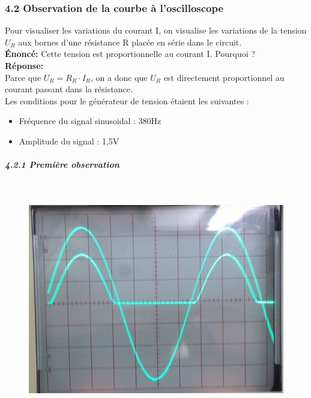 \documentclass{report}
\begin{document}
\newpage
\subsubsection*{4.2 Observation de la courbe \`a l'oscilloscope}
Pour visualiser les variations du courant I, on visualise les variations de la tension $U_{R}$ aux bornes d'une résistance R placée en série dans le circuit.\\

\textbf{\'Enonc\'e:} Cette tension est proportionnelle au courant I. Pourquoi ?\\

\textbf{R\'eponse:} \\

Parce que $U_{R} = R_{R} \cdot I_{R}$, on a donc que $U_{R}$ est directement proportionnel au courant passant dans la résistance.\\


Les conditions pour le générateur de tension étaient les suivantes : 

\begin{itemize}
\item Fr\'equence du signal sinusoidal : 380Hz
\item Amplitude du signal : 1,5V
\end{itemize}

\subparagraph*{4.2.1 Première observation} ~~\\

\begin{figure}[h!]
\centering
\includegraphics[scale=0.65]{Oscillo.jpg}
\end{figure}
\end{document}
